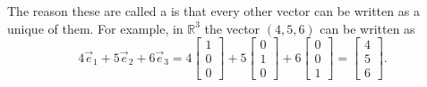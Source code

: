 The reason these are called a \emph{} is that every other
vector can be written as a unique \emph{} of them.
For example, in ${\mathbb R}^3$ the vector $(4,5,6)$ can be written as
\begin{equation*}
4 \vec{e}_1 + 
5 \vec{e}_2 + 
6 \vec{e}_3
=
4
\begin{bmatrix}
1 \\ 0 \\ 0
\end{bmatrix}
+
5
\begin{bmatrix}
0 \\ 1 \\ 0
\end{bmatrix}
+
6
\begin{bmatrix}
0 \\ 0 \\ 1
\end{bmatrix}
=
\begin{bmatrix}
4 \\ 5 \\ 6
\end{bmatrix} .
\end{equation*}

